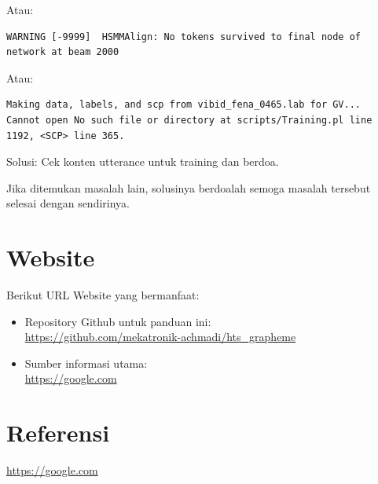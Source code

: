 \documentclass[12pt,]{article}
\begin{document}
\begin{itemize}
		Atau:
		\begin{verbatim}
WARNING [-9999]  HSMMAlign: No tokens survived to final node of network at beam 2000
		\end{verbatim}

		Atau:
		\begin{verbatim}
Making data, labels, and scp from vibid_fena_0465.lab for GV...
Cannot open No such file or directory at scripts/Training.pl line 1192, <SCP> line 365.
		\end{verbatim}

		Solusi: Cek konten utterance untuk training dan berdoa.

	\end{itemize}

	Jika ditemukan masalah lain, solusinya berdoalah semoga masalah tersebut selesai dengan sendirinya.

	\newpage
	\mbox{}

	\newpage
	\section{Website}

	Berikut URL Website yang bermanfaat:
	\begin{itemize}
		\item Repository Github untuk panduan ini:\\
		\url{https://github.com/mekatronik-achmadi/hts_grapheme}

		\item Sumber informasi utama:\\
		\url{https://google.com}

	\end{itemize}

	\newpage
	\mbox{}

	\newpage
	\section{Referensi}

	\url{https://google.com}

	\newpage
	\mbox{}
\end{document}
